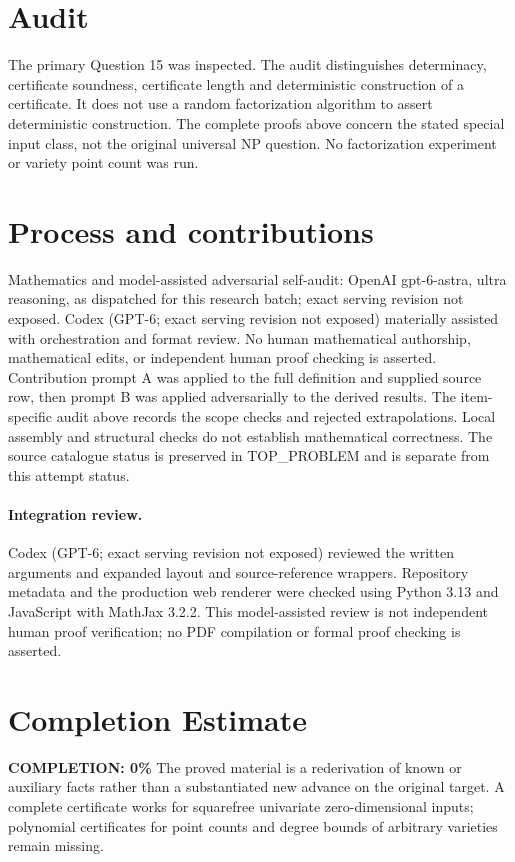 \documentclass[11pt]{article}
\begin{document}
\section{Audit}
The primary Question 15 was inspected. The audit distinguishes
determinacy, certificate soundness, certificate length and deterministic
construction of a certificate. It does not use a random factorization
algorithm to assert deterministic construction. The complete proofs
above concern the stated special input class, not the original universal
NP question. No factorization experiment or variety point count was run.

\section{Process and contributions}
Mathematics and model-assisted adversarial self-audit: OpenAI gpt-6-astra, ultra reasoning, as dispatched for this research batch; exact serving revision not exposed. Codex (GPT-6; exact serving revision not exposed) materially assisted with orchestration and format review. No human mathematical authorship, mathematical edits, or independent human proof checking is asserted.
Contribution prompt A was applied to the full definition and supplied source row, then prompt B was applied adversarially to the derived results. The item-specific audit above records the scope checks and rejected extrapolations. Local assembly and structural checks do not establish mathematical correctness. The source catalogue status is preserved in TOP\_PROBLEM and is separate from this attempt status.
\paragraph{Integration review.} Codex (GPT-6; exact serving revision not exposed) reviewed the written arguments and expanded layout and source-reference wrappers. Repository metadata and the production web renderer were checked using Python 3.13 and JavaScript with MathJax 3.2.2. This model-assisted review is not independent human proof verification; no PDF compilation or formal proof checking is asserted.

\section{Completion Estimate}
\noindent\textbf{COMPLETION: 0\%}
The proved material is a rederivation of known or auxiliary facts rather than a substantiated new advance on the original target. A complete certificate works for squarefree univariate zero-dimensional inputs; polynomial certificates for point counts and degree bounds of arbitrary varieties remain missing.
\end{document}
